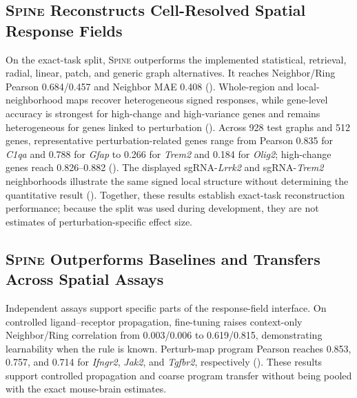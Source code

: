 \documentclass[sigconf,review,balance=false]{acmart}
\newcommand{\methodname}{\textsc{Spine}\xspace}
\begin{document}
\subsection{\methodname{} Reconstructs Cell-Resolved Spatial Response Fields}
\label{sec:validation_main_benchmark}
On the exact-task split, \methodname{} outperforms the implemented statistical,
retrieval, radial, linear, patch, and generic graph alternatives. It reaches
Neighbor/Ring Pearson 0.684/0.457 and Neighbor MAE 0.408
().
Whole-region and local-neighborhood maps recover heterogeneous signed responses,
while gene-level accuracy is strongest for high-change and high-variance genes
and remains heterogeneous for genes linked to perturbation
(). Across 928 test graphs and 512 genes,
representative perturbation-related genes range from
Pearson 0.835 for \textit{C1qa} and 0.788 for \textit{Gfap} to 0.266 for
\textit{Trem2} and 0.184 for \textit{Olig2}; high-change genes reach
0.826--0.882 (). The displayed sgRNA-\textit{Lrrk2}
and sgRNA-\textit{Trem2} neighborhoods illustrate the same signed local
structure without determining the quantitative result
(). Together, these results establish exact-task
reconstruction performance; because the split was used during development,
they are not estimates of perturbation-specific effect size.

\subsection{\methodname{} Outperforms Baselines and Transfers Across Spatial Assays}

Independent assays support specific parts of the response-field interface. On
controlled ligand--receptor propagation, fine-tuning raises context-only
Neighbor/Ring correlation from 0.003/0.006 to 0.619/0.815, demonstrating
learnability when the rule is known. Perturb-map program Pearson reaches
0.853, 0.757, and 0.714 for \textit{Ifngr2}, \textit{Jak2}, and
\textit{Tgfbr2}, respectively (). These results support
controlled propagation and coarse program transfer without being pooled with
the exact mouse-brain estimates.
\end{document}
